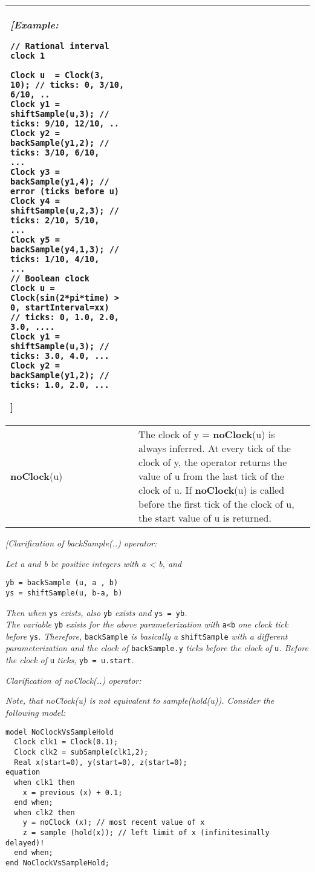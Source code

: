 \begin{longtable}[]{|p{4cm}|p{11cm}|}
\emph{{[}Example:}
\begin{lstlisting}[language=modelica]
// Rational interval clock 1

Clock u  = Clock(3, 10); // ticks: 0, 3/10, 6/10, ..
Clock y1 = shiftSample(u,3); // ticks: 9/10, 12/10, ..
Clock y2 = backSample(y1,2); // ticks: 3/10, 6/10,
...
Clock y3 = backSample(y1,4); // error (ticks before u)
Clock y4 = shiftSample(u,2,3); // ticks: 2/10, 5/10,
...
Clock y5 = backSample(y4,1,3); // ticks: 1/10, 4/10,
...
// Boolean clock
Clock u = Clock(sin(2*pi*time) > 0, startInterval=xx)
// ticks: 0, 1.0, 2.0, 3.0, ....
Clock y1 = shiftSample(u,3); // ticks: 3.0, 4.0, ...
Clock y2 = backSample(y1,2); // ticks: 1.0, 2.0, ...
\end{lstlisting}
{]}
\\ \hline
\textbf{noClock}(u)
&
The clock of y = \textbf{noClock}(u) is always inferred. At every tick
of the clock of y, the operator returns the value of u from the last
tick of the clock of u. If \textbf{noClock}(u) is called before the
first tick of the clock of u, the start value of u is returned.\\ \hline
\end{longtable}

\emph{{[}Clarification of backSample(..) operator:}

\emph{Let a and b be positive integers with a \textless{} b, and}
\begin{lstlisting}[language=modelica]
yb = backSample (u, a , b)
ys = shiftSample(u, b-a, b)
\end{lstlisting}

\emph{Then when} \lstinline!ys! \emph{exists, also} \lstinline!yb! \emph{exists and} \lstinline!ys = yb!\emph{.\\
The variable} \lstinline!yb! \emph{exists for the above parameterization with} \lstinline!a<b! \emph{one clock tick before} \lstinline!ys!\emph{. Therefore, }
\lstinline!backSample! \emph{is basically
a} \lstinline!shiftSample! \emph{with a different parameterization and the clock
of} \lstinline!backSample.y! \emph{ticks before the clock of} \lstinline!u!\emph{. Before the clock
of} \lstinline!u! \emph{ticks, }\lstinline!yb = u.start!\emph{.}

\emph{Clarification of noClock(..) operator:}

\emph{Note, that noClock(u) is not equivalent to sample(hold(u)).
Consider the following model:}

\begin{lstlisting}[language=modelica]
model NoClockVsSampleHold
  Clock clk1 = Clock(0.1);
  Clock clk2 = subSample(clk1,2);
  Real x(start=0), y(start=0), z(start=0);
equation
  when clk1 then
    x = previous (x) + 0.1;
  end when;
  when clk2 then
    y = noClock (x); // most recent value of x
    z = sample (hold(x)); // left limit of x (infinitesimally delayed)!
  end when;
end NoClockVsSampleHold;
\end{lstlisting}

